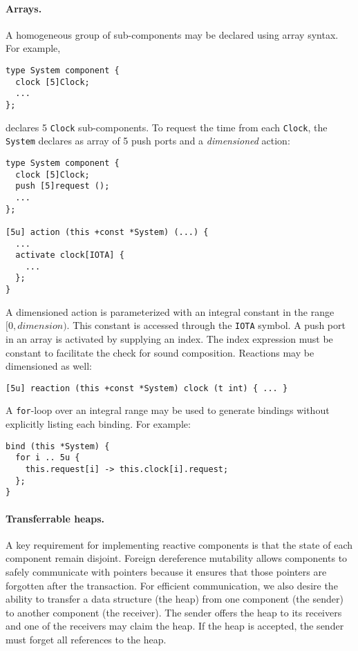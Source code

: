 \paragraph{Arrays.}
A homogeneous group of sub-components may be declared using array syntax.
For example,
\begin{verbatim}
type System component {
  clock [5]Clock;
  ...
};
\end{verbatim}
declares 5 \verb+Clock+ sub-components.
To request the time from each \verb+Clock+, the \verb+System+ declares as array of 5 push ports and a \emph{dimensioned} action:
\begin{verbatim}
type System component {
  clock [5]Clock;
  push [5]request ();
  ...
};

[5u] action (this +const *System) (...) {
  ...
  activate clock[IOTA] {
    ...
  };
}
\end{verbatim}
A dimensioned action is parameterized with an integral constant in the range $[0,dimension)$.
This constant is accessed through the \verb+IOTA+ symbol.
A push port in an array is activated by supplying an index.
The index expression must be constant to facilitate the check for sound composition.
Reactions may be dimensioned as well:
\begin{verbatim}
[5u] reaction (this +const *System) clock (t int) { ... }
\end{verbatim}
A \verb+for+-loop over an integral range may be used to generate bindings without explicitly listing each binding.
For example:
\begin{verbatim}
bind (this *System) {
  for i .. 5u {
    this.request[i] -> this.clock[i].request;
  };
}
\end{verbatim}

\paragraph{Transferrable heaps.}
A key requirement for implementing reactive components is that the state of each component remain disjoint.
Foreign dereference mutability allows components to safely communicate with pointers because it ensures that those pointers are forgotten after the transaction.
For efficient communication, we also desire the ability to transfer a data structure (the heap) from one component (the sender) to another component (the receiver).
The sender offers the heap to its receivers and one of the receivers may claim the heap.
If the heap is accepted, the sender must forget all references to the heap.

